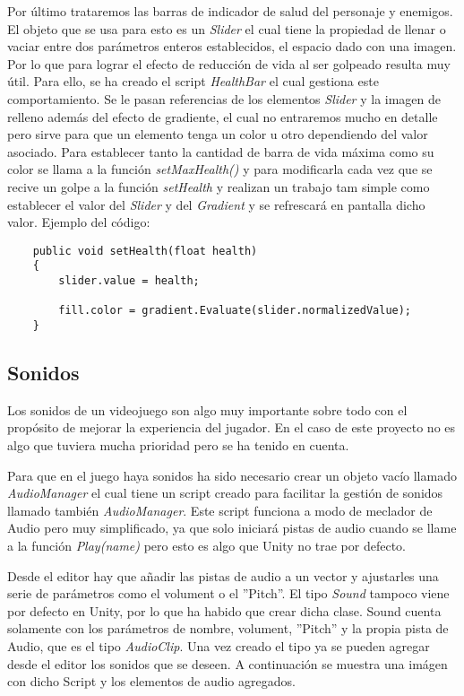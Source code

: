 Por último trataremos las barras de indicador de salud del personaje y enemigos. El objeto que se usa para esto es un  \textit{Slider} el cual tiene la propiedad de llenar o vaciar entre dos parámetros enteros establecidos, el espacio dado con una imagen. Por lo que para lograr el efecto de reducción de vida al ser golpeado resulta muy útil. Para ello, se ha creado el script \textit{HealthBar} el cual gestiona este comportamiento. Se le pasan referencias de los elementos \textit{Slider} y la imagen de relleno además del efecto de gradiente, el cual no entraremos mucho en detalle pero sirve para que un elemento tenga un color u otro dependiendo del valor asociado. Para establecer tanto la cantidad de barra de vida máxima como su color se llama a la función \textit{setMaxHealth()} y para modificarla cada vez que se recive un golpe a la función \textit{setHealth} y realizan un trabajo tam simple como establecer el valor del \textit{Slider} y del \textit{Gradient} y se refrescará en pantalla dicho valor. Ejemplo del código: 

\begin{lstlisting}
    public void setHealth(float health)
    {
        slider.value = health;

        fill.color = gradient.Evaluate(slider.normalizedValue);
    }
\end{lstlisting}

\subsection{Sonidos}

Los sonidos de un videojuego son algo muy importante sobre todo con el propósito de mejorar la experiencia del jugador. En el caso de este proyecto no es algo que tuviera mucha prioridad pero se ha tenido en cuenta. 

Para que en el juego haya sonidos ha sido necesario crear un objeto vacío llamado \textit{AudioManager} el cual tiene un script creado para facilitar la gestión de sonidos llamado también \textit{AudioManager}. Este script funciona a modo de meclador de Audio pero muy simplificado, ya que solo iniciará pistas de audio cuando se llame a la función \textit{Play(name)} pero esto es algo que Unity no trae por defecto.

Desde el editor hay que añadir las pistas de audio a un vector y ajustarles una serie de parámetros como el volument o el ''Pitch''. El tipo \textit{Sound} tampoco viene por defecto en Unity, por lo que ha habido que crear dicha clase. Sound cuenta solamente con los parámetros de nombre, volument, ''Pitch'' y la propia pista de Audio, que es el tipo \textit{AudioClip}. Una vez creado el tipo ya se pueden agregar desde el editor los sonidos que se deseen. A continuación se muestra una imágen con dicho Script y los elementos de audio agregados.

